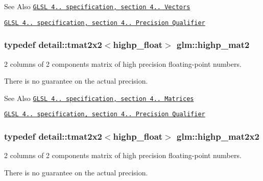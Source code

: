 \begin{DoxySeeAlso}{See Also}
\href{http://www.opengl.org/registry/doc/GLSLangSpec.4.20.8.pdf}{\tt G\-L\-S\-L 4.. specification, section 4.. Vectors} 

\href{http://www.opengl.org/registry/doc/GLSLangSpec.4.20.8.pdf}{\tt G\-L\-S\-L 4.. specification, section 4.. Precision Qualifier} 
\end{DoxySeeAlso}
\hypertarget{group__core__precision_ga6652bb577f74f322220305a985a8c200}{
\subsubsection[{highp\-\_\-mat2}]{\setlength{\rightskip}{0pt plus 5cm}typedef detail\-::tmat2x2$<$highp\-\_\-float$>$ {\bf glm\-::highp\-\_\-mat2}}}\label{group__core__precision_ga6652bb577f74f322220305a985a8c200}


2 columns of 2 components matrix of high precision floating-\/point numbers. 

There is no guarantee on the actual precision.

\begin{DoxySeeAlso}{See Also}
\href{http://www.opengl.org/registry/doc/GLSLangSpec.4.20.8.pdf}{\tt G\-L\-S\-L 4.. specification, section 4.. Matrices} 

\href{http://www.opengl.org/registry/doc/GLSLangSpec.4.20.8.pdf}{\tt G\-L\-S\-L 4.. specification, section 4.. Precision Qualifier} 
\end{DoxySeeAlso}
\hypertarget{group__core__precision_gadc6208de252d8c5d4afd1a3518370db3}{
\subsubsection[{highp\-\_\-mat2x2}]{\setlength{\rightskip}{0pt plus 5cm}typedef detail\-::tmat2x2$<$highp\-\_\-float$>$ {\bf glm\-::highp\-\_\-mat2x2}}}\label{group__core__precision_gadc6208de252d8c5d4afd1a3518370db3}


2 columns of 2 components matrix of high precision floating-\/point numbers. 

There is no guarantee on the actual precision.

